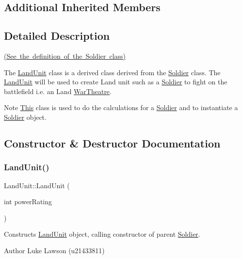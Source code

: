 \subsection*{Additional Inherited Members}


\subsection{Detailed Description}
\mbox{\hyperlink{_soldier_8h_source}{(See the definition of the Soldier class)}}

The \mbox{\hyperlink{class_land_unit}{Land\+Unit}} class is a derived class derived from the \mbox{\hyperlink{class_soldier}{Soldier}} class. The \mbox{\hyperlink{class_land_unit}{Land\+Unit}} will be used to create Land unit such as a \mbox{\hyperlink{class_soldier}{Soldier}} to fight on the battlefield i.\+e. an Land \mbox{\hyperlink{class_war_theatre}{War\+Theatre}}. \begin{DoxyNote}{Note}
\mbox{\hyperlink{class_this}{This}} class is used to do the calculations for a \mbox{\hyperlink{class_soldier}{Soldier}} and to instantiate a \mbox{\hyperlink{class_soldier}{Soldier}} object. 
\end{DoxyNote}


\subsection{Constructor \& Destructor Documentation}
\mbox{\label{class_land_unit_ac7c62d6ea8573a8689afaddc04837279}} 
\subsubsection{\texorpdfstring{LandUnit()}{LandUnit()}}
{\footnotesize\ttfamily Land\+Unit\+::\+Land\+Unit (\begin{DoxyParamCaption}\item[{int}]{power\+Rating }\end{DoxyParamCaption})}



Constructs \mbox{\hyperlink{class_land_unit}{Land\+Unit}} object, calling constructor of parent \mbox{\hyperlink{class_soldier}{Soldier}}. 

\begin{DoxyAuthor}{Author}
Luke Lawson (u21433811) 
\end{DoxyAuthor}

